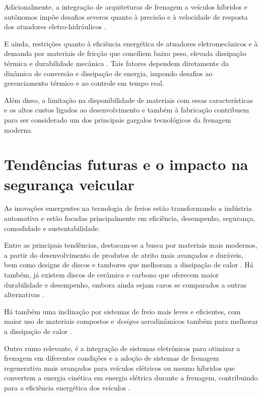 Adicionalmente, a integração de arquiteturas de frenagem a veículos híbridos e autônomos impõe desafios severos quanto à precisão e à velocidade de resposta dos atuadores eletro-hidráulicos \cite{Donghai2022, Lentin2022}.

E ainda, restrições quanto à eficiência energética de atuadores eletromecânicos e à demanda por materiais de fricção que conciliem baixo peso, elevada dissipação térmica e durabilidade mecânica \cite{Donghai2022, AndrewJ2022}. Tais fatores dependem diretamente da dinâmica de conversão e dissipação de energia, impondo desafios ao gerenciamento térmico e ao controle em tempo real.


Além disso, a limitação na disponibilidade de materiais com essas características e os altos custos ligados ao desenvolvimento e também à fabricação contribuem para ser considerado um dos principais gargalos tecnológicos da frenagem moderna.

\section{Tendências futuras e o impacto na segurança veicular}
\label{sec:o-estado-da-arte-7}

As inovações emergentes na tecnologia de freios estão transformando a indústria automotiva e estão focadas principalmente em eficiência, desempenho, segurança, comodidade e sustentabilidade.

Entre as principais tendências, destacam-se a busca por materiais mais modernos, a partir do desenvolvimento de produtos de atrito mais avançados e duráveis, bem como designs de discos e tambores que melhoram a dissipação de calor \cite{Rudolf2011, AndrewJ2022}. Há também, já existem discos de cerâmica e carbono que oferecem maior durabilidade e desempenho, embora ainda sejam caros se comparados a outras alternativas \cite{Konrad2014, Lentin2022}.

Há também uma inclinação por sistemas de freio mais leves e eficientes, com maior uso de materiais compostos e \textit{designs} aerodinâmicos também para melhorar a dissipação de calor \cite{Rudolf2011}.

Outro rumo relevante, é a integração de sistemas  eletrônicos para otimizar a frenagem em diferentes condições e a adoção de sistemas de frenagem regenerativa mais avançados para veículos elétricos \cite{Rudolf2011} ou mesmo híbridos que convertem a energia cinética em energia elétrica durante a frenagem, contribuindo para a eficiência energética dos veículos \cite{AndrewJ2022}.

